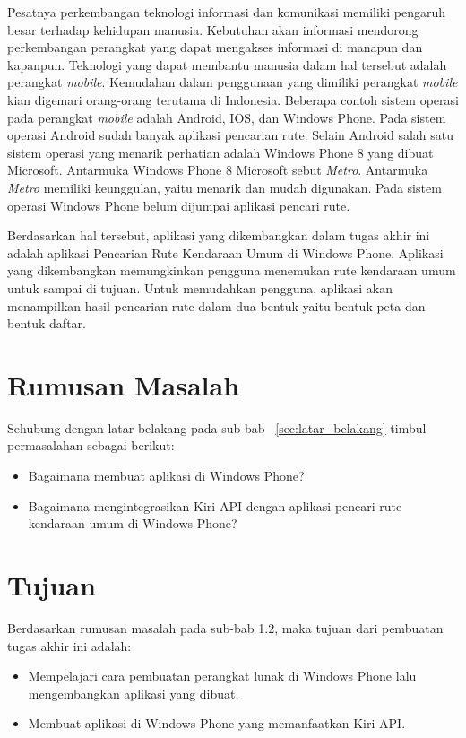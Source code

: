 Pesatnya perkembangan teknologi informasi dan komunikasi memiliki pengaruh besar terhadap kehidupan manusia. Kebutuhan akan informasi mendorong perkembangan perangkat yang dapat mengakses informasi di manapun dan kapanpun. Teknologi yang dapat membantu manusia dalam hal tersebut adalah perangkat \textit{mobile}. Kemudahan dalam penggunaan yang dimiliki perangkat \textit{mobile} kian digemari orang-orang terutama di Indonesia. Beberapa contoh sistem operasi pada perangkat \textit{mobile} adalah Android, IOS, dan Windows Phone. Pada sistem operasi Android sudah banyak aplikasi pencarian rute. Selain Android salah satu sistem operasi yang menarik perhatian adalah Windows Phone 8 yang dibuat Microsoft. Antarmuka Windows Phone 8 Microsoft sebut \textit{Metro}. Antarmuka \textit{Metro} memiliki keunggulan, yaitu menarik dan mudah digunakan. Pada sistem operasi Windows Phone belum dijumpai aplikasi pencari rute.

Berdasarkan hal tersebut, aplikasi yang dikembangkan dalam tugas akhir ini adalah aplikasi Pencarian Rute Kendaraan Umum di Windows Phone. Aplikasi yang dikembangkan memungkinkan pengguna menemukan rute kendaraan umum untuk sampai di tujuan. Untuk memudahkan pengguna, aplikasi akan menampilkan hasil pencarian rute dalam dua bentuk yaitu bentuk peta dan bentuk daftar. 

\section{Rumusan Masalah}
\label{sec:rumusan_masalah}
Sehubung dengan latar belakang pada sub-bab ~\ref{sec:latar_belakang} timbul permasalahan sebagai berikut:
\begin{itemize}
	\item Bagaimana membuat aplikasi di Windows Phone?
	\item Bagaimana mengintegrasikan Kiri API dengan aplikasi pencari rute kendaraan umum di Windows Phone?
\end{itemize}

\section{Tujuan}
\label{sec:tujuan}
Berdasarkan rumusan masalah pada sub-bab 1.2, maka tujuan dari pembuatan tugas akhir ini adalah:
\begin{itemize}
	\item Mempelajari cara pembuatan perangkat lunak di Windows Phone lalu mengembangkan aplikasi yang dibuat.
	\item Membuat aplikasi di Windows Phone yang memanfaatkan Kiri API.
\end{itemize}

